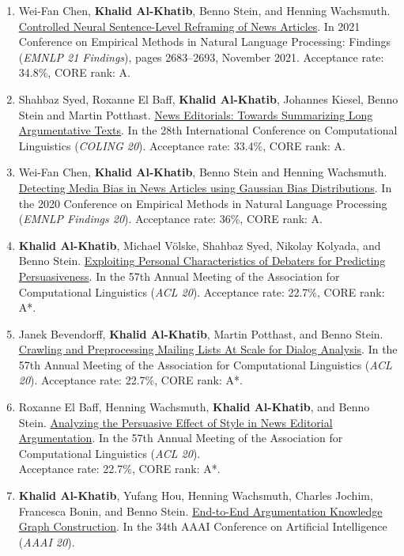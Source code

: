 \begin{enumerate}
\item{Wei-Fan Chen, \textbf{Khalid Al-Khatib}, Benno Stein, and Henning Wachsmuth. \href{https://aclanthology.org/2021.findings-emnlp.228/}{Controlled Neural Sentence-Level Reframing of News Articles}. In 2021 Conference on Empirical Methods in Natural Language Processing: Findings (\textit{EMNLP 21 Findings}), pages 2683–2693, November 2021.
Acceptance rate: 34.8\%, CORE rank: A. 
}
\item {Shahbaz Syed, Roxanne El Baff, \textbf{Khalid Al-Khatib}, Johannes Kiesel, Benno Stein and Martin Potthast. \href{https://aclanthology.org/2020.coling-main.470/}{News Editorials: Towards Summarizing Long Argumentative Texts}. In the 28th International Conference on Computational Linguistics (\textit{COLING 20}).
Acceptance rate: 33.4\%, CORE rank: A. 
}
\item {Wei-Fan Chen, \textbf{Khalid Al-Khatib}, Benno Stein and Henning Wachsmuth. \href{https://aclanthology.org/2020.findings-emnlp.383/}{Detecting Media Bias in News Articles using Gaussian Bias Distributions}. In the 2020 Conference on Empirical Methods in Natural Language Processing (\textit{EMNLP Findings 20}).
Acceptance rate: 36\%, CORE rank: A. 
}
\item {\textbf{Khalid Al-Khatib}, Michael Völske, Shahbaz Syed, Nikolay Kolyada, and Benno Stein. \href{https://aclanthology.org/2020.acl-main.632/}{Exploiting Personal Characteristics of Debaters for Predicting Persuasiveness}. In the 57th Annual Meeting of the Association for Computational Linguistics (\textit{ACL 20}).
Acceptance rate: 22.7\%, CORE rank: A*.
}
\item {Janek Bevendorff, \textbf{Khalid Al-Khatib}, Martin Potthast, and Benno Stein. \href{https://aclanthology.org/2020.acl-main.108/}{Crawling and Preprocessing Mailing Lists At Scale for Dialog Analysis}. In the 57th Annual Meeting of the Association for Computational Linguistics (\textit{ACL 20}).
Acceptance rate: 22.7\%, CORE rank: A*. 
}
\item {Roxanne El Baff, Henning Wachsmuth, \textbf{Khalid Al-Khatib}, and Benno Stein. \href{https://aclanthology.org/2020.acl-main.287/}{Analyzing the Persuasive Effect of Style in News Editorial Argumentation}. In the 57th Annual Meeting of the Association for Computational Linguistics (\textit{ACL 20}).\\
Acceptance rate: 22.7\%, CORE rank: A*.
}
\item {\textbf{Khalid Al-Khatib}, Yufang Hou, Henning Wachsmuth, Charles Jochim, Francesca Bonin, and Benno Stein. \href{https://doi.org/10.1609/aaai.v34i05.6231}{End-to-End Argumentation Knowledge Graph Construction}. In the 34th AAAI Conference on Artificial Intelligence (\textit{AAAI 20}).
}
\end{enumerate}
